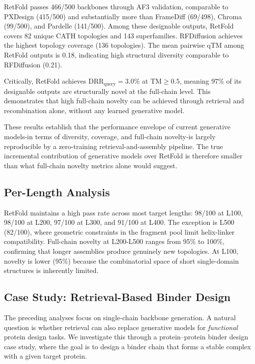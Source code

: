 \documentclass[letterpaper]{article} %
\begin{document}
RetFold passes 466/500 backbones through AF3 validation, comparable to PXDesign (415/500) and substantially more than FrameDiff (69/498), Chroma (99/500), and Pardelle (141/500). Among these designable outputs, RetFold covers 82 unique CATH topologies and 143 superfamilies. RFDiffusion achieves the highest topology coverage (136 topologies). The mean pairwise qTM among RetFold outputs is 0.18, indicating high structural diversity comparable to RFDiffusion (0.21).

Critically, RetFold achieves $\mathrm{DRR_{query}} = 3.0\%$ at TM${\geq}0.5$, meaning 97\% of its designable outputs are structurally novel at the full-chain level. This demonstrates that high full-chain novelty can be achieved through retrieval and recombination alone, without any learned generative model.

These results establish that the performance envelope of current generative models-in terms of diversity, coverage, and full-chain novelty-is largely reproducible by a zero-training retrieval-and-assembly pipeline. The true incremental contribution of generative models over RetFold is therefore smaller than what full-chain novelty metrics alone would suggest.

\subsection{Per-Length Analysis}

RetFold maintains a high pass rate across most target lengths: 98/100 at L100, 98/100 at L200, 97/100 at L300, and 91/100 at L400. The exception is L500 (82/100), where geometric constraints in the fragment pool limit helix-linker compatibility. Full-chain novelty at L200-L500 ranges from 95\% to 100\%, confirming that longer assemblies produce genuinely new topologies. At L100, novelty is lower (95\%) because the combinatorial space of short single-domain structures is inherently limited.

\subsection{Case Study: Retrieval-Based Binder Design}

The preceding analyses focus on single-chain backbone generation. A natural question is whether retrieval can also replace generative models for \emph{functional} protein design tasks. We investigate this through a protein--protein binder design case study, where the goal is to design a binder chain that forms a stable complex with a given target protein.
\end{document}
